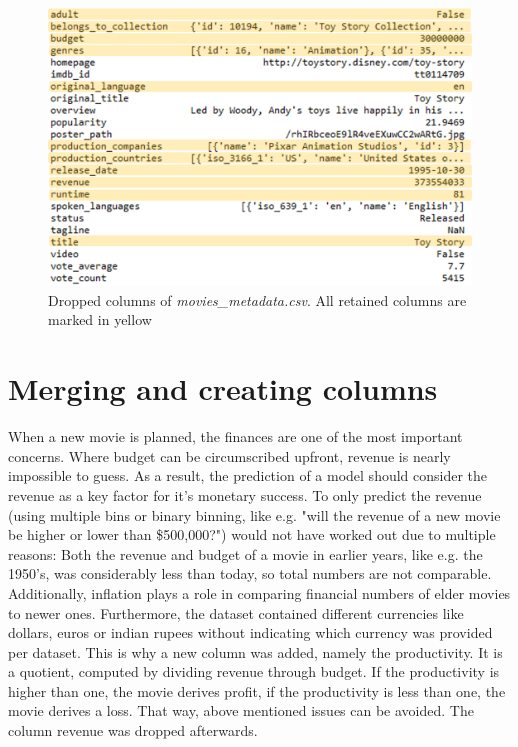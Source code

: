 \begin{figure}
	\includegraphics[width=\textwidth]{images/3_metadata_columns.png}
	\caption{Dropped columns of \textit{movies\_metadata.csv}. All retained columns are marked in yellow}
	\label{img:mm_columns}
\end{figure}

\section{Merging and creating columns}
When a new movie is planned, the finances are one of the most important concerns. Where budget can be circumscribed upfront, revenue is nearly impossible to guess. As a result, the prediction of a model should consider the revenue as a key factor for it's monetary success. To only predict the revenue (using multiple bins or binary binning, like e.g. "will the revenue of a new movie be higher or lower than \$500,000?") would not have worked out due to multiple reasons: Both the revenue and budget of a movie in earlier years, like e.g. the 1950's, was considerably less than today, so total numbers are not comparable. Additionally, inflation plays a role in comparing financial numbers of elder movies to newer ones. Furthermore, the dataset contained different currencies like dollars, euros or indian rupees without indicating which currency was provided per dataset. This is why a new column was added, namely the productivity. It is a quotient, computed by dividing revenue through budget. If the productivity is higher than one, the movie derives profit, if the productivity is less than one, the movie derives a loss. That way, above mentioned issues can be avoided. The column revenue was dropped afterwards.


